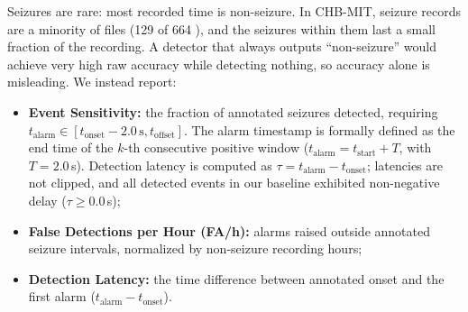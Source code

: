 \documentclass[10pt,twocolumn,letterpaper]{article}
\begin{document}
Seizures are rare: most recorded time is non-seizure. In CHB-MIT,
seizure records are a minority of files (129 of 664
\cite{guttag2010chbmit}), and the seizures within them last a small
fraction of the recording. A detector that always outputs
``non-seizure'' would achieve very high raw accuracy while detecting
nothing, so accuracy alone is misleading. We instead report:
\begin{itemize}
  \item \textbf{Event Sensitivity:} the fraction of annotated seizures detected, requiring $t_{\text{alarm}} \in [t_{\text{onset}} - 2.0\,\text{s}, t_{\text{offset}}]$. The alarm timestamp is formally defined as the end time of the $k$-th consecutive positive window ($t_{\text{alarm}} = t_{\text{start}} + T$, with $T=2.0$\,s). Detection latency is computed as $\tau = t_{\text{alarm}} - t_{\text{onset}}$; latencies are not clipped, and all detected events in our baseline exhibited non-negative delay ($\tau \ge 0.0$\,s);
  \item \textbf{False Detections per Hour (FA/h):} alarms raised outside annotated seizure intervals, normalized by non-seizure recording hours;
  \item \textbf{Detection Latency:} the time difference between annotated onset and the first alarm ($t_{\text{alarm}} - t_{\text{onset}}$).
\end{itemize}
\end{document}
